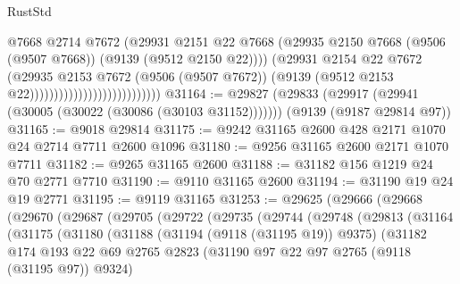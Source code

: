 \begin{lexlean}{RustStd}
\begin{coremodule}
                                                  @7668
                                                  @2714
                                                  @7672
                                                  (@29931
                                                    @2151
                                                    @22
                                                    @7668
                                                    (@29935
                                                      @2150
                                                      @7668
                                                      (@9506 (@9507 @7668))
                                                      (@9139 (@9512 @2150 @22))))
                                                  (@29931
                                                    @2154
                                                    @22
                                                    @7672
                                                    (@29935
                                                      @2153
                                                      @7672
                                                      (@9506 (@9507 @7672))
                                                      (@9139
                                                        (@9512 @2153 @22)))))))))))))))))))))))))))
@31164 := @29827
    (@29833 (@29917 (@29941 (@30005 (@30022 (@30086 (@30103 @31152)))))))
    (@9139 (@9187 @29814 @97))
@31165 := @9018 @29814
@31175 := @9242 @31165 @2600 @428 @2171 @1070 @24 @2714 @7711 @2600 @1096
@31180 := @9256 @31165 @2600 @2171 @1070 @7711
@31182 := @9265 @31165 @2600
@31188 := @31182 @156 @1219 @24 @70 @2771 @7710
@31190 := @9110 @31165 @2600
@31194 := @31190 @19 @24 @19 @2771
@31195 := @9119 @31165
@31253 := @29625
    (@29666
      (@29668
        (@29670
          (@29687
            (@29705
              (@29722
                (@29735
                  (@29744
                    (@29748
                      (@29813
                        (@31164
                          (@31175
                            (@31180
                              (@31188
                                (@31194 (@9118 (@31195 @19)) @9375)
                                (@31182
                                  @174
                                  @193
                                  @22
                                  @69
                                  @2765
                                  @2823
                                  (@31190 @97 @22 @97 @2765 (@9118 (@31195 @97)) @9324)

\end{coremodule}
\end{lexlean}
